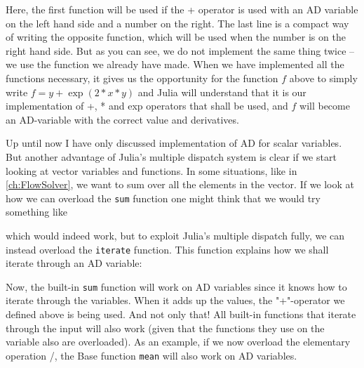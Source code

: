 
Here, the first function will be used if the + operator is used with an AD variable on the left hand side and a number on the right. The last line is a compact way of writing the opposite function, which will be used when the number is on the right hand side. But as you can see, we do not implement the same thing twice -- we use the function we already have made. When we have implemented all the functions necessary, it gives us the opportunity for the function $f$ above to simply write $f = y+\exp(2*x*y)$ and Julia will understand that it is our implementation of +, * and exp operators that shall be used, and $f$ will become an AD-variable with the correct value and derivatives. 

Up until now I have only discussed implementation of AD for scalar variables. But another advantage of Julia's multiple dispatch system is clear if we start looking at vector variables and functions. In some situations, like in \autoref{ch:FlowSolver}, we want to sum over all the elements in the vector. If we look at how we can overload the \texttt{sum} function one might think that we would try something like

which would indeed work, but to exploit Julia's multiple dispatch fully, we can instead overload the \texttt{iterate} function. This function explains how we shall iterate through an AD variable: 

Now, the built-in \texttt{sum} function will work on AD variables since it knows how to iterate through the variables. When it adds up the values, the "+"-operator we defined above is being used. And not only that! All built-in functions that iterate through the input will also work (given that the functions they use on the variable also are overloaded). As an example, if we now overload the elementary operation /, the Base function \texttt{mean} will also work on AD variables.

